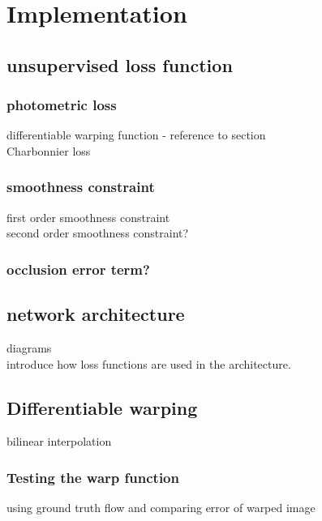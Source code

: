 
\section{Implementation}
\subsection{unsupervised loss function}

\subsubsection{photometric loss}
differentiable warping function - reference to section\\
Charbonnier loss\\

\subsubsection{smoothness constraint}
first order smoothness constraint\\
second order smoothness constraint?\\

\subsubsection{occlusion error term?}

\subsection{network architecture}
diagrams\\
introduce how loss functions are used in the architecture.\\

\subsection{Differentiable warping}
bilinear interpolation\\

\subsubsection{Testing the warp function}
using ground truth flow and comparing error of warped image\\
